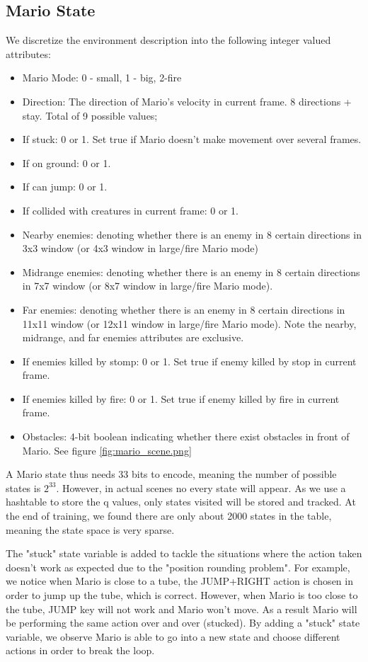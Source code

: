 \subsection{Mario State}
We discretize the environment description into the following integer valued attributes:
\begin{itemize}
\item
Mario Mode: 0 - small, 1 - big, 2-fire
\item
Direction: The direction of Mario's velocity in current frame. 8 directions + stay. Total of 9 possible values;
\item
If stuck: 0 or 1. Set true if Mario doesn't make movement over several frames.
\item 
If on ground: 0 or 1. 
\item
If can jump: 0 or 1.
\item
If collided with creatures in current frame: 0 or 1.
\item
Nearby enemies: denoting whether there is an enemy in 8 certain directions in 3x3 window (or 4x3 window in large/fire Mario mode)
\item
Midrange enemies: denoting whether there is an enemy in 8 certain directions in 7x7 window (or 8x7 window in large/fire Mario mode).
\item
Far enemies: denoting whether there is an enemy in 8 certain directions in 11x11 window (or 12x11 window in large/fire Mario mode). Note the nearby, midrange, and far enemies attributes are exclusive.
\item
If enemies killed by stomp: 0 or 1. Set true if enemy killed by stop in current frame.
\item
If enemies killed by fire: 0 or 1. Set true if enemy killed by fire in current frame.
\item
Obstacles: 4-bit boolean indicating whether there exist obstacles in front of Mario. See figure \ref{fig:mario_scene.png}
\end{itemize}

A Mario state thus needs 33 bits to encode, meaning the number of possible states is $2^33$. However, in actual scenes no every state will appear. As we use a hashtable to store the q values, only states visited will be stored and tracked. At the end of training, we found there are only about 2000 states in the table, meaning the state space is very sparse.

The "stuck" state variable is added to tackle the situations where the action taken doesn't work as expected due to the "position rounding problem". For example, we notice when Mario is close to a tube, the JUMP+RIGHT action is chosen in order to jump up the tube, which is correct. However, when Mario is too close to the tube, JUMP key will not work and Mario won't move. As a result Mario will be performing the same action over and over (stucked). By adding a "stuck" state variable, we observe Mario is able to go into a new state and choose different actions in order to break the loop.

